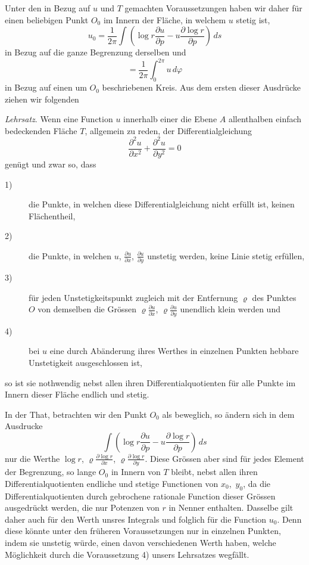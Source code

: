 \documentclass[a4paper,12pt]{article}
\begin{document}
Unter den in Bezug auf $u$ und $T$ gemachten Voraussetzungen
haben wir daher f\"{u}r einen beliebigen Punkt $O_0$ im Innern der
Fl\"{a}che, in welchem $u$ stetig ist,
\[ u_0 = \frac{1}{2\pi} \int \left(
            \log r \frac{\partial u }{\partial p}
          - u  \frac{\partial \log r}{\partial p}
         \right) \, ds \]
in Bezug auf die ganze Begrenzung derselben und
\[ = \frac{1}{2\pi} \int_0^{2\pi} u \, d \varphi \]
in Bezug auf einen um $O_0$ beschriebenen Kreis.  Aus dem ersten
dieser Ausdr\"{u}cke ziehen wir folgenden

\emph{Lehrsatz}.  Wenn eine Function $u$ innerhalb einer die
Ebene $A$ allenthalben einfach bedeckenden Fl\"{a}che $T$,
allgemein zu reden, der Differentialgleichung
\[    \frac{\partial^2 u }{\partial x^2}
    + \frac{\partial^2 u }{\partial y^2}
   = 0 \]
gen\"{u}gt und zwar so, dass
\begin{description}

\item[\textmd{1)}]
die Punkte, in welchen diese Differentialgleichung nicht
erf\"{u}llt ist, keinen Fl\"{a}chentheil,

\item[\textmd{2)}]
die Punkte, in welchen $u$,
$\displaystyle \frac{\partial u}{\partial x}$,
$\displaystyle \frac{\partial u}{\partial y}$
unstetig werden, keine Linie stetig erf\"{u}llen,

\item[\textmd{3)}]
f\"{u}r jeden Unstetigkeitspunkt zugleich mit der Entfernung
$\varrho$ des Punktes $O$ von demselben die Gr\"{o}ssen
$\displaystyle \varrho \frac{\partial u}{\partial x}$,
$\displaystyle \varrho \frac{\partial u}{\partial y}$
unendlich klein werden und

\item[\textmd{4)}]
bei $u$ eine durch Ab\"{a}nderung ihres Werthes in einzelnen
Punkten hebbare Unstetigkeit ausgeschlossen ist,
\end{description}

\noindent
so ist sie nothwendig nebst allen ihren Differentialquotienten
f\"{u}r alle Punkte im Innern dieser Fl\"{a}che endlich und
stetig.

In der That, betrachten wir den Punkt $O_0$ als beweglich, so
\"{a}ndern sich in dem Ausdrucke
\[ \int \left(
            \log r \frac{\partial u }{\partial p}
          - u  \frac{\partial \log r}{\partial p}
         \right) \, ds \]
nur die Werthe
$\log r$,
$\displaystyle \varrho \frac{\partial \log r}{\partial x}$,
$\displaystyle \varrho \frac{\partial \log r}{\partial y}$.
Diese Gr\"{o}ssen aber sind f\"{u}r jedes Element der Begrenzung,
so lange $O_0$ in Innern von $T$ bleibt, nebst allen ihren
Differentialquotienten endliche und stetige Functionen von
$x_0$,~$y_0$, da die Differentialquotienten durch gebrochene
rationale Function dieser Gr\"{o}ssen ausgedr\"{u}ckt werden, die
nur Potenzen von $r$ in Nenner enthalten.  Dasselbe gilt daher
auch f\"{u}r den Werth unsres Integrals und folglich f\"{u}r die
Function $u_0$.  Denn diese k\"{o}nnte unter den fr\"{u}heren
Voraussetzungen nur in einzelnen Punkten, indem sie unstetig
w\"{u}rde, einen davon verschiedenen Werth haben, welche
M\"{o}glichkeit durch die Voraussetzung 4) unsers Lehrsatzes
wegf\"{a}llt.
\end{document}
